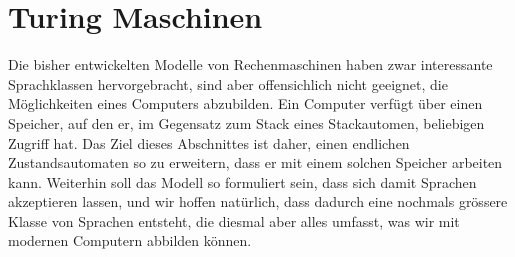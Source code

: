 %
%
%
\chapter{Turing Maschinen\label{chapter-turing}}
Die bisher entwickelten Modelle von Rechenmaschinen haben zwar
interessante Sprachklassen hervorgebracht, sind aber offensichlich nicht
geeignet, die Möglichkeiten eines Computers abzubilden. Ein
Computer verfügt über einen Speicher, auf den er, im Gegensatz zum
Stack eines Stackautomen, beliebigen Zugriff hat. Das Ziel dieses
Abschnittes ist daher, einen endlichen Zustandsautomaten so zu
erweitern, dass er mit einem solchen Speicher arbeiten kann.
Weiterhin soll das Modell so formuliert sein, dass sich damit
Sprachen akzeptieren lassen, und wir hoffen natürlich, dass dadurch
eine nochmals grössere Klasse von Sprachen entsteht, die diesmal
aber alles umfasst, was wir mit modernen Computern abbilden können.






